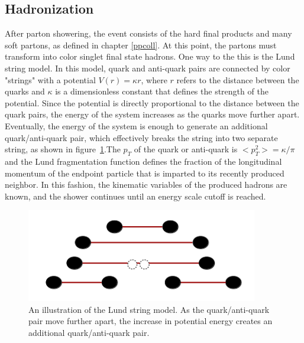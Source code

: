\documentclass[oneside, letterpaper, oldfontcommands]{memoir}
\begin{document}
\subsection{Hadronization}\label{hadronization}
 
\qquad After parton showering, the event consists of the hard final products and many soft partons, as defined in chapter \ref{ppcoll}. At this point, the partons must transform into color singlet final state hadrons. One way to the this is the Lund string model\cite{Barger:020105876}. In this model, quark and anti-quark pairs are connected by color "strings" with a potential 
$V(r) = \kappa r $, where $r$ refers to the distance between the quarks and $\kappa$ is a dimensionless constant that defines the strength of the potential. Since the potential is directly proportional to the distance between the quark pairs, the energy of the system increases as the quarks move further apart. Eventually, the energy of the system is enough to generate an additional quark/anti-quark pair, which effectively breaks the string into two separate string, as shown in figure~\ref{fig:lund}.The $p_{T}$ of the quark or anti-quark is  
$<p^{2}_{T}> = \kappa / \pi$ and the Lund fragmentation function\cite{Agashe:2014kda} defines the fraction of the longitudinal momentum of the endpoint particle that is imparted to its recently produced neighbor. In this fashion, the kinematic variables of the produced hadrons are known, and the shower continues until an energy scale cutoff is reached.

\begin{figure}[here]
\includegraphics[width=0.9\textwidth]{lundstring.png}
\caption{An illustration of the Lund string model. As the quark/anti-quark pair move further apart, the increase in potential energy creates an additional quark/anti-quark pair.}
\label{fig:lund}
\end{figure}


\end{document}
